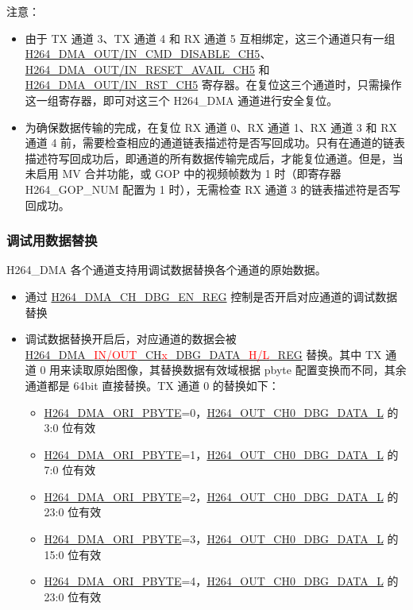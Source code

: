 \documentclass[main\_\_CN.tex]{subfiles}
\begin{document}
注意：
\begin{itemize}
    \item 由于 TX 通道 3、TX 通道 4 和 RX 通道 5 互相绑定，这三个通道只有一组 \hyperref[fielddesc:H264DMAINCMDDISABLECH5]{H264\_DMA\_OUT/IN\_CMD\_DISABLE\_CH5}、\hyperref[fielddesc:H264DMAINRESETAVAILCH5]{H264\_DMA\_OUT/IN\_RESET\_AVAIL\_CH5} 和 \hyperref[fielddesc:H264DMAINRSTCH5]{H264\_DMA\_OUT/IN\_RST\_CH5} 寄存器。在复位这三个通道时，只需操作这一组寄存器，即可对这三个 H264\_DMA 通道进行安全复位。
    \item 为确保数据传输的完成，在复位 RX 通道 0、RX 通道 1、RX 通道 3 和 RX 通道 4 前，需要检查相应的通道链表描述符是否写回成功。只有在通道的链表描述符写回成功后，即通道的所有数据传输完成后，才能复位通道。但是，当未启用 MV 合并功能，或 GOP 中的视频帧数为 1 时（即寄存器 H264\_GOP\_NUM 配置为 1 时），无需检查 RX 通道 3 的链表描述符是否写回成功。
\end{itemize}

\subsubsection{调试用数据替换}\label{sec:h264-dma-debug}
H264\_DMA 各个通道支持用调试数据替换各个通道的原始数据。

\begin{itemize}
    \item 通过 \hyperref[regdesc:H264DMACHDBGENREG]{H264\_DMA\_CH\_DBG\_EN\_REG} 控制是否开启对应通道的调试数据替换
    \item 调试数据替换开启后，对应通道的数据会被 \hyperref[regdesc:H264DMAOUTCH0DBGDATALREG]{H264\_DMA\_\textcolor{red}{IN/OUT}\_CH\textcolor{red}{x}\_DBG\_DATA\_\textcolor{red}{H/L}\_REG} 替换。其中 TX 通道 0 用来读取原始图像，其替换数据有效域根据 pbyte 配置变换而不同，其余通道都是 64bit 直接替换。TX 通道 0 的替换如下：
    \begin{itemize}
        \item \hyperref[fielddesc:H264DMAORIPBYTE]{H264\_DMA\_ORI\_PBYTE}=0，\hyperref[fielddesc:H264OUTCH0DBGDATAL]{H264\_OUT\_CH0\_DBG\_DATA\_L} 的 3:0 位有效
        \item \hyperref[fielddesc:H264DMAORIPBYTE]{H264\_DMA\_ORI\_PBYTE}=1，\hyperref[fielddesc:H264OUTCH0DBGDATAL]{H264\_OUT\_CH0\_DBG\_DATA\_L} 的 7:0 位有效
        \item \hyperref[fielddesc:H264DMAORIPBYTE]{H264\_DMA\_ORI\_PBYTE}=2，\hyperref[fielddesc:H264OUTCH0DBGDATAL]{H264\_OUT\_CH0\_DBG\_DATA\_L} 的 23:0 位有效
        \item \hyperref[fielddesc:H264DMAORIPBYTE]{H264\_DMA\_ORI\_PBYTE}=3，\hyperref[fielddesc:H264OUTCH0DBGDATAL]{H264\_OUT\_CH0\_DBG\_DATA\_L} 的 15:0 位有效
        \item \hyperref[fielddesc:H264DMAORIPBYTE]{H264\_DMA\_ORI\_PBYTE}=4，\hyperref[fielddesc:H264OUTCH0DBGDATAL]{H264\_OUT\_CH0\_DBG\_DATA\_L} 的 23:0 位有效
    \end{itemize}
\end{itemize}
\end{document}
